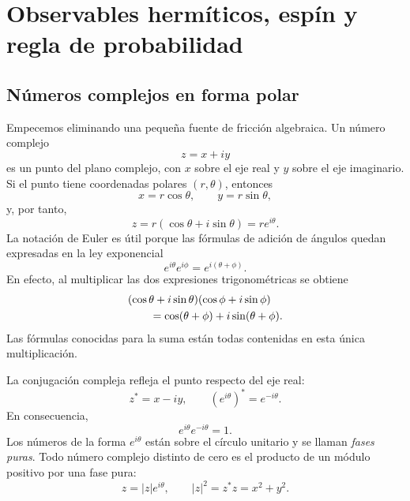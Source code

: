 \chapter{Observables hermíticos, espín y regla de probabilidad}


\section{Números complejos en forma polar}

Empecemos eliminando una pequeña fuente de fricción algebraica. Un número complejo
\begin{equation}
  z=x+iy
\end{equation}
es un punto del plano complejo, con \(x\) sobre el eje real y \(y\) sobre el eje imaginario. Si el punto tiene coordenadas polares \((r,\theta)\), entonces
\begin{equation}
  x=r\cos\theta,
  \qquad
  y=r\sin\theta,
\end{equation}
y, por tanto,
\begin{equation}
  z=r(\cos\theta+i\sin\theta)=re^{i\theta}.
  \label{eq:l03-polar-form}
\end{equation}
La notación de Euler es útil porque las fórmulas de adición de ángulos quedan expresadas en la ley exponencial
\begin{equation}
  e^{i\theta}e^{i\phi}
  =e^{i(\theta+\phi)}.
  \label{eq:l03-phase-product}
\end{equation}
En efecto, al multiplicar las dos expresiones trigonométricas se obtiene
\begin{align}
& (\cos\theta+i\sin\theta)(\cos\phi+i\sin\phi)
\notag\\
&\qquad=\cos(\theta+\phi)+i\sin(\theta+\phi).
\end{align}
Las fórmulas conocidas para la suma están todas contenidas en esta única multiplicación.

La conjugación compleja refleja el punto respecto del eje real:
\begin{equation}
  z^*=x-iy,
  \qquad
  (e^{i\theta})^*=e^{-i\theta}.
\end{equation}
En consecuencia,
\begin{equation}
  e^{i\theta}e^{-i\theta}=1.
\end{equation}
Los números de la forma \(e^{i\theta}\) están sobre el círculo unitario y se llaman \emph{fases puras}. Todo número complejo distinto de cero es el producto de un módulo positivo por una fase pura:
\begin{equation}
  z=|z|e^{i\theta},
  \qquad
  |z|^2=z^*z=x^2+y^2.
  \label{eq:l03-modulus-phase}
\end{equation}

